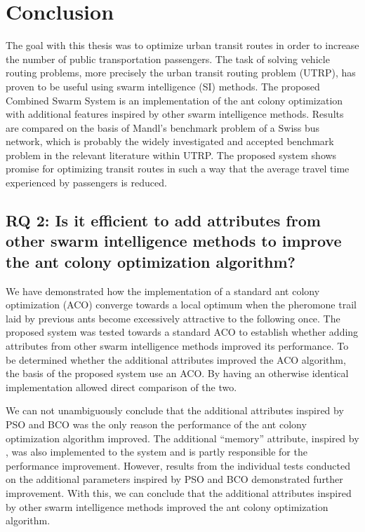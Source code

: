 \section{Conclusion}
\label{sec:conclusion}

The goal with this thesis was to optimize urban transit routes in order to increase the number of public transportation passengers. The task of solving vehicle routing problems, more precisely the urban transit routing problem (UTRP), has proven to be useful using swarm intelligence (SI) methods. The proposed Combined Swarm System is an implementation of the ant colony optimization with additional features inspired by other swarm intelligence methods. Results are compared on the basis of Mandl's benchmark problem of a Swiss bus network, which is probably the widely investigated and accepted benchmark problem in the relevant literature within UTRP. The proposed system shows promise for optimizing transit routes in such a way that the average travel time experienced by passengers is reduced. 

\subsection*{RQ 2: Is it efficient to add attributes from other swarm intelligence methods to improve the ant colony optimization algorithm?}

We have demonstrated how the implementation of a standard ant colony optimization (ACO) converge towards a local optimum when the pheromone trail laid by previous ants become excessively attractive to the following once. The proposed system was tested towards a standard ACO to establish whether adding attributes from other swarm intelligence methods improved its performance. To be determined whether the additional attributes improved the ACO algorithm, the basis of the proposed system use an ACO. By having an otherwise identical implementation allowed direct comparison of the two. %

We can not unambiguously conclude that the additional attributes inspired by PSO and BCO was the only reason the performance of the ant colony optimization algorithm improved. The additional ``memory'' attribute, inspired by \citet{dorigo96, sedighpour14, poorzahedy11, salehinejad10}, was also implemented to the system and is partly responsible for the performance improvement. However, results from the individual tests conducted on the additional parameters inspired by PSO and BCO demonstrated further improvement. With this, we can conclude that the additional attributes inspired by other swarm intelligence methods improved the ant colony optimization algorithm. 

